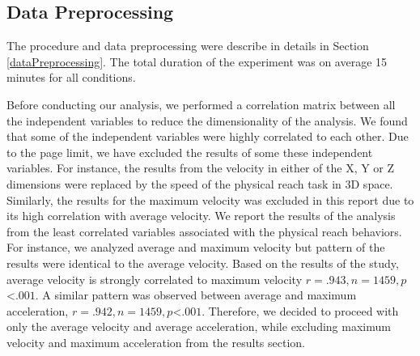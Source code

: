 \subsection{Data Preprocessing}
The procedure and data preprocessing were describe in details in Section \ref{dataPreprocessing}. The total duration of the experiment was on average 15 minutes for all conditions. 

Before conducting our analysis, we performed a correlation matrix between all the independent variables to reduce the dimensionality of the analysis. We found that some of the independent variables were highly correlated to each other. Due to the page limit, we have excluded the results of some these independent variables. For instance, the results from the velocity in either of the X, Y or Z dimensions were replaced by the speed of the physical reach task in 3D space. Similarly, the results for the maximum velocity was excluded in this report due to its high correlation with average velocity. We report the results of the analysis from the least correlated variables associated with the physical reach behaviors. For instance, we analyzed average and maximum velocity but pattern of the results were identical to the average velocity. Based on the results of the study, average velocity is strongly correlated to maximum velocity $r=.943, n= 1459, p$\textless$.001$. A similar pattern was observed between average and maximum acceleration, $r=.942, n= 1459, p$\textless$.001$. Therefore, we decided to proceed with only the average velocity and average acceleration, while excluding maximum velocity and maximum acceleration from the results section. 

